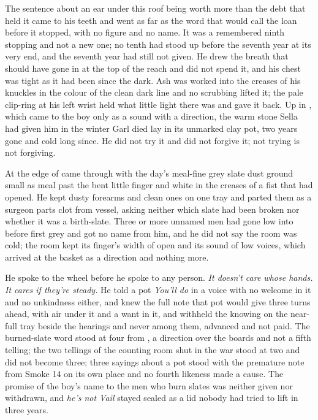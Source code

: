 The sentence about an ear under this roof being worth more than the debt that held it came to his teeth and went as far as the word that would call the loan before it stopped, with no figure and no name. It was a remembered ninth stopping and not a new one; no tenth had stood up before the seventh year at its very end, and the seventh year had still not given. He drew the breath that should have gone in at the top of the reach and did not spend it, and his chest was tight as it had been since the dark. Ash was worked into the creases of his knuckles in the colour of the clean dark line and no scrubbing lifted it; the pale clip-ring at his left wrist held what little light there was and gave it back. Up in , which came to the boy only as a sound with a direction, the warm stone Sella had given him in the winter Garl died lay in its unmarked clay pot, two years gone and cold long since. He did not try it and did not forgive it; not trying is not forgiving.

At the edge of   came through with the day's meal-fine grey slate dust ground small as meal past the bent little finger and white in the creases of a fist that had opened. He kept dusty forearms and clean ones on one tray and parted them as a surgeon parts clot from vessel, asking neither which slate had been broken nor whether it was a birth-slate. Three or more unnamed men had gone low into  before first grey and got no name from him, and he did not say the room was cold; the room kept its finger's width of open and its sound of low voices, which arrived at the basket as a direction and nothing more.

He spoke to the wheel before he spoke to any person. \emph{It doesn't care whose hands. It cares if they're steady.} He told a pot \emph{You'll do} in a voice with no welcome in it and no unkindness either, and knew the full note that pot would give three turns ahead, with air under it and a want in it, and withheld the knowing on the near-full tray beside the hearings and never among them, advanced and not paid. The burned-slate word stood at four from , a direction over the boards and not a fifth telling; the two tellings of the counting room shut in the war stood at two and did not become three; three sayings about a pot stood with the premature note from Smoke 14 on its own place and no fourth likeness made a cause. The promise of the boy's name to the men who burn slates was neither given nor withdrawn, and \emph{he's not Vail} stayed sealed as a lid nobody had tried to lift in three years.

